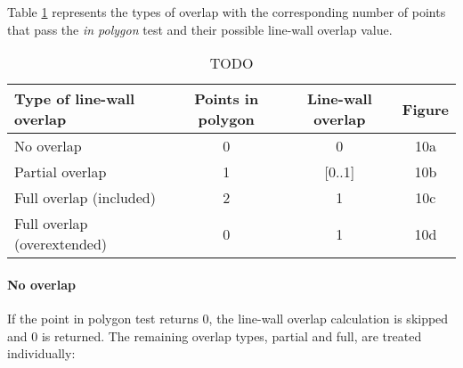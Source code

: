 	Table \ref{tab:lwatypes} represents the types of overlap with the corresponding number of points
	that pass the \emph{in polygon} test and their possible line-wall overlap
	value.\\ 

	\begin{table}[ht]
		\caption{TODO}
		\label{tab:lwatypes}

		\begin{tabular}{|l||c|c|c|}
		\hline
		Type of line-wall overlap 			&	Points in polygon 			& Line-wall overlap & Figure \\
		\hline
		\hline
		No overlap					&	0					& 0		& 10a\\
		\hline
		Partial overlap 				&	1					& [0..1]	& 10b\\
		\hline
		Full overlap (included)		&	2					& 1		& 10c\\
		\hline
		Full overlap (overextended)		&  	0					& 1 		& 10d\\
		\hline
		\end{tabular}
	\end{table}

	\paragraph{No overlap}
	If the point in polygon test returns 0, the line-wall overlap calculation
	is skipped and 0 is returned. The remaining overlap types, partial and full,
	are treated individually:\\




